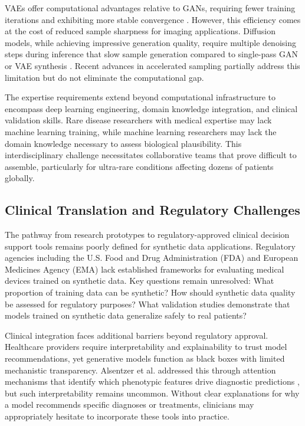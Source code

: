 VAEs offer computational advantages relative to GANs, requiring fewer training iterations and exhibiting more stable convergence \cite{mendes2025synthetic}. However, this efficiency comes at the cost of reduced sample sharpness for imaging applications. Diffusion models, while achieving impressive generation quality, require multiple denoising steps during inference that slow sample generation compared to single-pass GAN or VAE synthesis \cite{zhong2024meddiffusion}. Recent advances in accelerated sampling partially address this limitation but do not eliminate the computational gap.

The expertise requirements extend beyond computational infrastructure to encompass deep learning engineering, domain knowledge integration, and clinical validation skills. Rare disease researchers with medical expertise may lack machine learning training, while machine learning researchers may lack the domain knowledge necessary to assess biological plausibility. This interdisciplinary challenge necessitates collaborative teams that prove difficult to assemble, particularly for ultra-rare conditions affecting dozens of patients globally.

\subsection{Clinical Translation and Regulatory Challenges}

The pathway from research prototypes to regulatory-approved clinical decision support tools remains poorly defined for synthetic data applications. Regulatory agencies including the U.S. Food and Drug Administration (FDA) and European Medicines Agency (EMA) lack established frameworks for evaluating medical devices trained on synthetic data. Key questions remain unresolved: What proportion of training data can be synthetic? How should synthetic data quality be assessed for regulatory purposes? What validation studies demonstrate that models trained on synthetic data generalize safely to real patients?

Clinical integration faces additional barriers beyond regulatory approval. Healthcare providers require interpretability and explainability to trust model recommendations, yet generative models function as black boxes with limited mechanistic transparency. Alsentzer et al. addressed this through attention mechanisms that identify which phenotypic features drive diagnostic predictions \cite{alsentzer2025few}, but such interpretability remains uncommon. Without clear explanations for why a model recommends specific diagnoses or treatments, clinicians may appropriately hesitate to incorporate these tools into practice.

